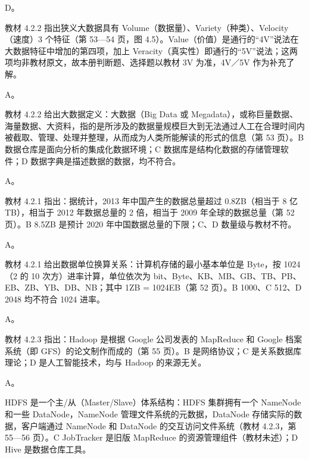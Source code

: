 \documentclass[a4paper,11pt]{article}
\begin{document}


\q D。\begin{analysis}教材 4.2.2 指出狭义大数据具有 Volume（数据量）、Variety（种类）、Velocity（速度）3 个特征（第 53—54 页，图 4.5）。Value（价值）是通行的“4V”说法在大数据特征中增加的第四项，加上 Veracity（真实性）即通行的“5V”说法；这两项均非教材原文，故本册判断题、选择题以教材 3V 为准，4V／5V 作为补充了解。\end{analysis}

\q A。\begin{analysis}教材 4.2.2 给出大数据定义：大数据（Big Data 或 Megadata），或称巨量数据、海量数据、大资料，指的是所涉及的数据量规模巨大到无法通过人工在合理时间内被截取、管理、处理并整理，从而成为人类所能解读的形式的信息（第 53 页）。B 数据仓库是面向分析的集成化数据环境；C 数据库是结构化数据的存储管理软件；D 数据字典是描述数据的数据，均不符合。\end{analysis}

\q A。\begin{analysis}教材 4.2.1 指出：据统计，2013 年中国产生的数据总量超过 0.8ZB（相当于 8 亿 TB），相当于 2012 年数据总量的 2 倍，相当于 2009 年全球的数据总量（第 52 页）。B 8.5ZB 是预计 2020 年中国数据总量的下限；C、D 数量级与教材不符。\end{analysis}

\q A。\begin{analysis}教材 4.2.1 给出数据单位换算关系：计算机存储的最小基本单位是 Byte，按 1024（2 的 10 次方）进率计算，单位依次为 bit、Byte、KB、MB、GB、TB、PB、EB、ZB、YB、DB、NB；其中 1ZB = 1024EB（第 52 页）。B 1000、C 512、D 2048 均不符合 1024 进率。\end{analysis}

\q A。\begin{analysis}教材 4.2.3 指出：Hadoop 是根据 Google 公司发表的 MapReduce 和 Google 档案系统（即 GFS）的论文制作而成的（第 55 页）。B 是网络协议；C 是关系数据库理论；D 是人工智能技术，均与 Hadoop 的来源无关。\end{analysis}

\q A。\begin{analysis}HDFS 是一个主/从（Master/Slave）体系结构：HDFS 集群拥有一个 NameNode 和一些 DataNode，NameNode 管理文件系统的元数据，DataNode 存储实际的数据，客户端通过 NameNode 和 DataNode 的交互访问文件系统（教材 4.2.3，第 55—56 页）。C JobTracker 是旧版 MapReduce 的资源管理组件（教材未述）；D Hive 是数据仓库工具。\end{analysis}
\end{document}
